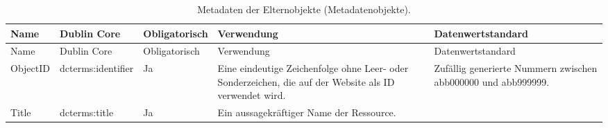 \documentclass[
  nswissgerman,
  letterpaper,
  DIV=11,
  numbers=noendperiod]{scrartcl}
\begin{document}
\begin{longtable}[]{@{}
  >{\raggedright\arraybackslash}p{}
  >{\raggedright\arraybackslash}p{}
  >{\raggedright\arraybackslash}p{}
  >{\raggedright\arraybackslash}p{}
  >{\raggedright\arraybackslash}p{}@{}}
\caption{Metadaten der Elternobjekte
(Metadatenobjekte).}\label{tbl-metadata-objects}\tabularnewline
\toprule\noalign{}
\begin{minipage}[b]{\linewidth}\raggedright
Name
\end{minipage} & \begin{minipage}[b]{\linewidth}\raggedright
Dublin Core
\end{minipage} & \begin{minipage}[b]{\linewidth}\raggedright
Obligatorisch
\end{minipage} & \begin{minipage}[b]{\linewidth}\raggedright
Verwendung
\end{minipage} & \begin{minipage}[b]{\linewidth}\raggedright
Datenwertstandard
\end{minipage} \\
\midrule\noalign{}
\endfirsthead
\toprule\noalign{}
\begin{minipage}[b]{\linewidth}\raggedright
Name
\end{minipage} & \begin{minipage}[b]{\linewidth}\raggedright
Dublin Core
\end{minipage} & \begin{minipage}[b]{\linewidth}\raggedright
Obligatorisch
\end{minipage} & \begin{minipage}[b]{\linewidth}\raggedright
Verwendung
\end{minipage} & \begin{minipage}[b]{\linewidth}\raggedright
Datenwertstandard
\end{minipage} \\
\midrule\noalign{}
\endhead
\bottomrule\noalign{}
\endlastfoot
ObjectID & dcterms:identifier & Ja & Eine eindeutige Zeichenfolge ohne
Leer- oder Sonderzeichen, die auf der Website als ID verwendet wird. &
Zufällig generierte Nummern zwischen abb000000 und abb999999. \\
Title & dcterms:title & Ja & Ein aussagekräftiger Name der Ressource. &

\end{longtable}
\end{document}
